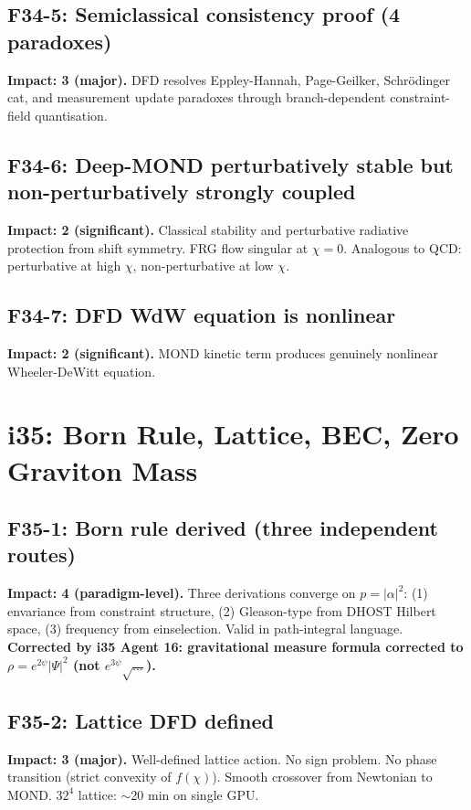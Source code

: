 \documentclass[11pt,a4paper]{article}
\begin{document}
\subsection{F34-5: Semiclassical consistency proof (4 paradoxes)}
\textbf{Impact: 3 (major).} DFD resolves Eppley-Hannah, Page-Geilker, Schr\"odinger cat, and measurement update paradoxes through branch-dependent constraint-field quantisation.

\subsection{F34-6: Deep-MOND perturbatively stable but non-perturbatively strongly coupled}
\textbf{Impact: 2 (significant).} Classical stability and perturbative radiative protection from shift symmetry. FRG flow singular at $\chi = 0$. Analogous to QCD: perturbative at high $\chi$, non-perturbative at low $\chi$.

\subsection{F34-7: DFD WdW equation is nonlinear}
\textbf{Impact: 2 (significant).} MOND kinetic term produces genuinely nonlinear Wheeler-DeWitt equation.

\section{i35: Born Rule, Lattice, BEC, Zero Graviton Mass}
\label{sec:i35}

\subsection{F35-1: Born rule derived (three independent routes)}
\textbf{Impact: 4 (paradigm-level).} Three derivations converge on $p = |\alpha|^2$: (1) envariance from constraint structure, (2) Gleason-type from DHOST Hilbert space, (3) frequency from einselection. Valid in path-integral language. \textbf{Corrected by i35 Agent 16: gravitational measure formula corrected to $\rho = e^{2\psi}|\Psi|^2$ (not $e^{3\psi}\sqrt{\ldots}$).}

\subsection{F35-2: Lattice DFD defined}
\textbf{Impact: 3 (major).} Well-defined lattice action. No sign problem. No phase transition (strict convexity of $f(\chi)$). Smooth crossover from Newtonian to MOND. $32^4$ lattice: $\sim$20 min on single GPU.
\end{document}
